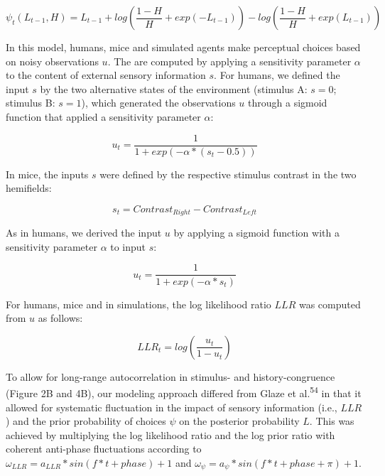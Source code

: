 \documentclass[
]{article}
\begin{document}
\begin{equation}
\psi_t(L_{t-1}, H)  = L_{t-1} + log(\frac{1-H}{H} + exp(-L_{t-1})) - log(\frac{1-H}{H} + exp(L_{t-1}))
\end{equation}

In this model, humans, mice and simulated agents make perceptual choices
based on noisy observations \(u\). The are computed by applying a
sensitivity parameter \(\alpha\) to the content of external sensory
information \(s\). For humans, we defined the input \(s\) by the two
alternative states of the environment (stimulus A: \(s = 0\); stimulus
B: \(s = 1\)), which generated the observations \(u\) through a sigmoid
function that applied a sensitivity parameter \(\alpha\):

\begin{equation}
u_t = \frac{1}{1+exp(-\alpha*(s_t-0.5))}
\end{equation}

In mice, the inputs \(s\) were defined by the respective stimulus
contrast in the two hemifields:

\begin{equation}
s_t = Contrast_{Right} - Contrast_{Left}
\end{equation}

As in humans, we derived the input \(u\) by applying a sigmoid function
with a sensitivity parameter \(\alpha\) to input \(s\):

\begin{equation}
u_t = \frac{1}{1 + exp(-\alpha * s_t)}
\end{equation}

For humans, mice and in simulations, the log likelihood ratio \(LLR\)
was computed from \(u\) as follows:

\begin{equation}
LLR_t = log(\frac{u_t}{1-u_t})
\end{equation}

To allow for long-range autocorrelation in stimulus- and
history-congruence (Figure 2B and 4B), our modeling approach differed
from Glaze et al.\textsuperscript{54} in that it allowed for systematic
fluctuation in the impact of sensory information (i.e., \(LLR\)) and the
prior probability of choices \(\psi\) on the posterior probability
\(L\). This was achieved by multiplying the log likelihood ratio and the
log prior ratio with coherent anti-phase fluctuations according to
\(\omega_{LLR} = a_{LLR} * sin(f * t + phase) + 1\) and
\(\omega_{\psi} = a_{\psi} * sin(f * t + phase + \pi) + 1\).
\end{document}
